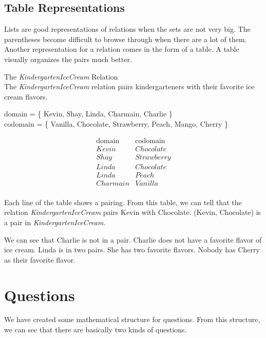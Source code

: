 \documentclass{ximera}
\begin{document}
\subsection{Table Representations}



Lists are good representations of relations when the sets are not very big. The parentheses become difficult to browse through when there are a lot of them. Another representation for a relation comes in the form of a table. A table visually organizes the pairs much better.

\begin{example} The \textit{KindergartenIceCream} Relation\\
The \textit{KindergartenIceCream} relation pairs kindergarteners with their favorite ice cream flavors.

domain = \{ Kevin, Shay, Linda, Charmain, Charlie \}  \\
codomain = \{ Vanilla, Chocolate, Strawberry, Peach, Mango, Cherry \} 

\[
\begin{array}{l|l}
    \text{domain}      & \text{codomain}      \\ \hline
    Kevin   &  Chocolate \\
    Shay   & Strawberry \\
    Linda  &  Chocolate \\
    Linda  &  Peach \\
    Charmain &  Vanilla \\ 
\end{array}
\]


Each line of the table shows a pairing. From this table, we can tell that the relation \textit{KindergartenIceCream} pairs Kevin with Chocolate.  (Kevin, Chocolate) is a pair in \textit{KindergartenIceCream}.

We can see that Charlie is not in a pair.  Charlie does not have a favorite flavor of ice cream. Linda is in two pairs.  She has two favorite flavors.  Nobody has Cherry as their favorite flavor.

\end{example} 





\section{Questions}


We have created some mathematical structure for questions. From this structure, we can see that there are basically two kinds of questions.
\end{document}
